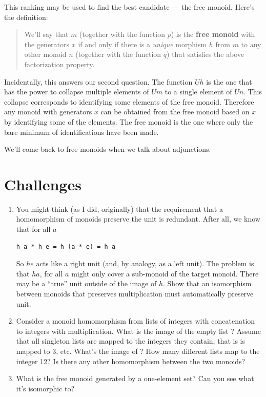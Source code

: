 \noindent
This ranking may be used to find the best candidate --- the free monoid.
Here's the definition:

\begin{quote}
We'll say that $m$ (together with the function $p$) is the
\textbf{free monoid} with the generators $x$ if and only if there
is a \emph{unique} morphism $h$ from $m$ to any other
monoid $n$ (together with the function $q$) that satisfies
the above factorization property.
\end{quote}
Incidentally, this answers our second question. The function
$U h$ is the one that has the power to collapse multiple
elements of $U m$ to a single element of $U n$. This
collapse corresponds to identifying some elements of the free monoid.
Therefore any monoid with generators $x$ can be obtained from the
free monoid based on $x$ by identifying some of the elements. The
free monoid is the one where only the bare minimum of identifications
have been made.

We'll come back to free monoids when we talk about adjunctions.

\section{Challenges}

\begin{enumerate}
\tightlist
\item
  You might think (as I did, originally) that the requirement that a
  homomorphism of monoids preserve the unit is redundant. After all, we
  know that for all $a$

\begin{Verbatim}
h a * h e = h (a * e) = h a
\end{Verbatim}
  So $h e$ acts like a right unit (and, by analogy, as a left
  unit). The problem is that $h a$, for all $a$ might
  only cover a sub-monoid of the target monoid. There may be a ``true''
  unit outside of the image of $h$. Show that an isomorphism
  between monoids that preserves multiplication must automatically
  preserve unit.
\item
  Consider a monoid homomorphism from lists of integers with
  concatenation to integers with multiplication. What is the image of
  the empty list \code{{[}{]}}? Assume that all singleton lists are
  mapped to the integers they contain, that is \code{{[}3{]}} is
  mapped to 3, etc. What's the image of \code{{[}1, 2, 3, 4{]}}?
  How many different lists map to the integer 12? Is there any other
  homomorphism between the two monoids?
\item
  What is the free monoid generated by a one-element set? Can you see
  what it's isomorphic to?
\end{enumerate}
